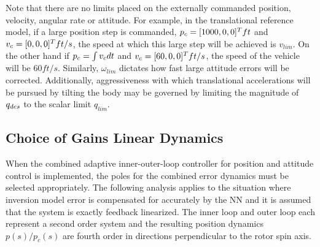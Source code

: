 \begin{remark}
\label{rem:vlimwlim}Note that there are no limits placed on the
externally commanded position, velocity, angular rate or attitude.
For example, in the translational reference model, if a large
position step is commanded, $p_c = [1000,0,0]^T ft$ and $v_c =
[0,0,0]^T ft/s$, the speed at which this large step will be achieved
is $v_{lim}$. On the other hand if \mbox{$p_c = \int v_c dt$} and
$v_c = [60, 0, 0]^T ft/s$, the speed of the vehicle will be $60
ft/s$. Similarly, $\omega_{lim}$ dictates how fast large attitude
errors will be corrected. Additionally, aggressiveness with which
translational accelerations will be pursued by tilting the body may
be governed by limiting the magnitude of $q_{des}$ to the scalar limit
$q_{lim}$.

\begin{comment}
For large $\ades$, the simple form of the outerloop inversion
will result in very large attitude corrections. Hence, the desired
attitude generated by the outerloop, \eq{e:qdessmallangle}, may be
implemented as
\begin{align}
\lambda &= \frac{q_{lim}}{q_{lim} + max(0,\|\Phi\| - q_{lim})}\\
\qdes   &=
q(\lambda\Delta\Phi_1,\lambda\Delta\Phi_2,\lambda\Delta\Phi_3)
\end{align}
where $q_{lim}$ is a limit on the attitude correction and
\mbox{$\|\lambda[\Delta\Phi_1,\Delta\Phi_2,\Delta\Phi_3]^T\| \leq
q_{lim}$}.
\end{comment}
\end{remark}

%
\subsection{Choice of Gains Linear Dynamics}
\label{s:gainchoice} When the combined adaptive inner-outer-loop
controller for position and attitude control is implemented, the
poles for the combined error dynamics must be selected appropriately.
The following analysis applies to the situation where inversion model
error is compensated for accurately by the NN and it is assumed that the
system is exactly feedback linearized. The inner loop and outer loop
each represent a second order system and the resulting position
dynamics $p(s)/p_c(s)$ are fourth order in directions perpendicular
to the rotor spin axis.

